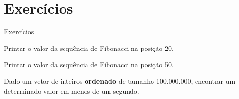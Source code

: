 \section{Exercícios}

\begin{slide}{Exercícios}

    \item Printar o valor da sequência de Fibonacci na posição 20.

    \item Printar o valor da sequência de Fibonacci na posição 50.

    \item Dado um vetor de inteiros \textbf{ordenado} de tamanho 100.000.000, encontrar um determinado valor em menos de um segundo.
\end{slide}
